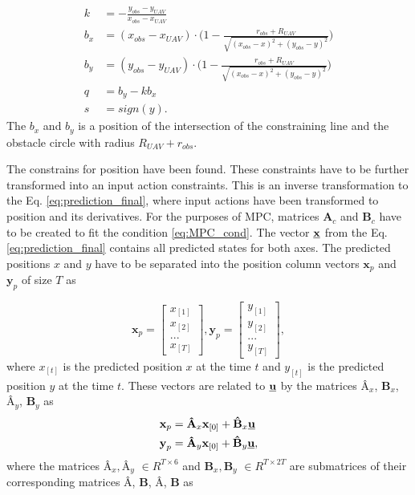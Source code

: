 \documentclass[a4paper,11pt,titlepage]{article}
\newcommand{\uvec}{\textbf{\underline{u}}}
\begin{document}
\begin{equation}
\label{eq:obstacle_constants}
\begin{split}
k &= -\frac{y_{obs} - y_{UAV}}{x_{obs} - x_{UAV}}\\
b_x &= (x_{obs}-x_{UAV})\cdot \big(1-\frac{r_{obs}+R_{UAV}}{\sqrt{(x_{obs} - x)^2 + (y_{obs} - y)^2}} \big)\\
b_y &= (y_{obs}-y_{UAV})\cdot \big(1-\frac{r_{obs}+R_{UAV}}{\sqrt{(x_{obs} - x)^2 + (y_{obs} - y)^2}} \big)\\
q &= b_y - kb_x\\
s &= sign(y).
\end{split}
\end{equation}
The $b_x$ and $b_y$ is a position of the intersection of the constraining line and the obstacle circle with radius $R_{UAV}+r_{obs}$. 

The constrains for position have been found. These constraints have to be further transformed into an input action constraints. This is an inverse transformation to the Eq. \ref{eq:prediction_final}, where input actions have been transformed to position and its derivatives. For the purposes of MPC, matrices $\textbf{A}_c $ and $\textbf{B}_c$ have to be created to fit the condition \ref{eq:MPC_cond}. The vector $\textbf{\underline{x}}$ from the Eq. \ref{eq:prediction_final} contains all predicted states for both axes. The predicted positions $x$ and $y$ have to be separated into the position column vectors $\textbf{x}_p$ and $\textbf{y}_p$ of size $T$ as 

\begin{equation}
\textbf{x}_p =
  \begin{bmatrix}
  x_{[1]} \\
  x_{[2]} \\
  ...	   \\
  x_{[T]}
  \end{bmatrix},\textbf{y}_p = \begin{bmatrix}
  y_{[1]} \\
  y_{[2]} \\
  ...	   \\
  y_{[T]}
  \end{bmatrix},
\end{equation}
where $x_{[t]}$ is the predicted position $x$ at the time $t$ and $y_{[t]}$ is the predicted position $y$ at the time $t$.
These vectors are related to $\uvec$ by the matrices $\textbf{\^A}_x$, $\textbf{\^B}_x$, $\textbf{\^A}_y$, $\textbf{\^B}_y$ as
\begin{equation}
\label{eq:pos_matrixes}
\begin{split}
\textbf{x}_p &= \textbf{\^A}_x \textbf{x}_{[0]} + \textbf{\^B}_x \uvec \\
\textbf{y}_p &= \textbf{\^A}_y \textbf{x}_{[0]} + \textbf{\^B}_y \uvec, \\
\end{split}
\end{equation}
where the matrices $\textbf{\^A}_x, \textbf{\^A}_y$ $\in R^{T \times 6}$ and $\textbf{\^B}_x, \textbf{\^B}_y$ $\in R^{T \times 2T}$ are submatrices of their corresponding matrices  $\textbf{\^A}$, $\textbf{\^B}$, $\textbf{\^A}$, $\textbf{\^B}$ as 
\end{document}
